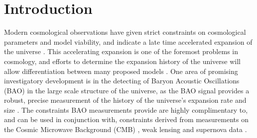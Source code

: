 \documentclass[titlesmallcaps, examinerscopy, copyrightpage]{uqthesis}
\begin{document}

\hypersetup{pageanchor=true}

\tableofcontents


\mainmatter


\chapter{Introduction}


Modern cosmological observations have given strict constraints on cosmological parameters and model viability, and indicate a late time accelerated expansion of the universe \citep{RiessFilippenko1998, PerlmutterAldering1999, SpergelVerde2003, RiessStrolger2004, TegmarkBlanton2004, SanchezBaugh2006, SpergelBean2007, Komatsu2009, RiessMacri2009, PercivalReid2010, ReidPercival2010,BlakeKazin2011}. This accelerating expansion is one of the foremost problems in cosmology, and efforts to determine the expansion history of the universe will allow differentiation between many proposed models \citep{SanchezScoccola2012, AlbrechtBernstein2006}. One area of promising investigatory development is in the detecting of Baryon Acoustic Oscillations (BAO) in the large scale structure of the universe, as the BAO signal provides a robust, precise measurement of the history of the universe's expansion rate and size \citep{BlakeGlazebrook2003,HuHaiman2003,SeoEisenstein2003,Linder2003}. The constraints BAO measurements provide are highly complimentary to, and can be used in conjunction with, constraints derived from measurements on the Cosmic Microwave Background (CMB) \citep{BennettHalpern2003, Planck201416}, weak lensing \citep{VanWaerbeke2000,WittmanTyson2000,KaiserWilson2000} and supernova data \citep{KowalskiRubin2008, KesslerBeckerCinabro2009, BetouleKessler2014}.\\
\end{document}
